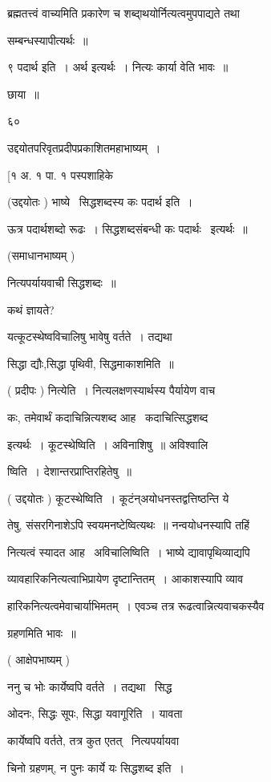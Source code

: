 \documentclass[11pt, openany]{book}
\begin{document}
ब्रह्मतत्त्वं वाच्यमिति प्रकारेण च शब्दा्थयोर्नित्यत्वमुपपाद्यते तथा 

सम्बन्धस्यापीत्यर्थः~॥ 

९ पदार्थ इति~। अर्थ इत्यर्थः~। नित्यः कार्या वेति भावः~॥ 

छाया~॥ 



६० 

उद्दयोतपरिवृतप्रदीपप्रकाशितमहाभाष्यम्~। 

[१ अ. १ पा. १ पस्पशाहिके 



(उद्दयोतः ) भाष्ये \textendash\ सिद्धशब्दस्य कः पदार्थ इति~। 

ऊत्र पदार्थशब्दो रूढः~। सिद्धशब्दसंबन्धी कः पदार्थः \textendash\ इत्यर्थः~॥ 

(समाधानभाष्यम् ) 

नित्यपर्यायवाची सिद्धशब्दः~॥ 

कथं ज्ञायते? 

यत्कूटस्थेष्वविचालिषु भावेषु वर्तते~। तद्यथा \textendash\ 

सिद्धा द्यौः,सिद्धा पृथिवी, सिद्धमाकाशमिति~॥ 

( प्रदीपः ) नित्येति~। नित्यलक्षणस्यार्थस्य पैर्यायेण वाच \textendash\ 

कः, तमेवार्थं कदाचिन्नित्यशब्द आह \textendash\ कदाचित्सिद्धशब्द 

इत्यर्थः~। कूटस्थेष्विति~। अविनाशिषु~॥ अविश्वालि \textendash\ 

ष्विति~। देशान्तरप्राप्तिरहितेषु~॥ 

( उद्दयोतः ) कूटस्थेष्विति~। कूटंन्अयोधनस्तद्वत्तिष्ठन्ति ये 

तेषु, संसरगिनाशेऽपि स्वयमनष्टेष्वित्यथः~॥ नन्वयोधनस्यापि तहिं 

नित्यत्वं स्यादत आह \textendash\ अविचालिष्विति~। भाष्ये द्यावापृथिव्याद्यपि 

व्यावहारिकनित्यत्वाभिप्रायेण दृष्टान्तितम्~। आकाशस्यापि व्याव \textendash\ 

हारिकनित्यत्वमेवाचार्याभिमतम्~। एवञ्च तत्र रूढत्वान्नित्यवाचकस्यैव 

ग्रहणमिति भावः~॥ 

( आक्षेपभाष्यम् ) 

ननु च भोः कार्येष्वपि वर्तते~। तद्यथा \textendash\ सिद्ध 

ओदनः, सिद्धः सूपः, सिद्धा यवागूरिति~। यावता 

कार्येष्वपि वर्तते, तत्र कुत एतत् \textendash\ नित्यपर्यायवा \textendash\ 

चिनो ग्रहणम्, न पुनः कार्ये यः सिद्धशब्द इति~। 
\end{document}
